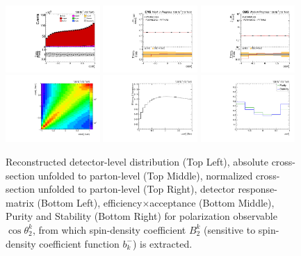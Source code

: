 \begin{figure}[htb]
\begin{center}
 \includegraphics[width=0.32\textwidth]{fig_fullRun2UL/controlplots/combined/Hyp_LeptonBk.pdf}
 \includegraphics[width=0.32\textwidth]{fig_fullRun2UL/unfolding/combined/UnfoldedResults_b2k.pdf}
 \includegraphics[width=0.32\textwidth]{fig_fullRun2UL/unfolding/combined/UnfoldedResultsNorm_b2k.pdf} \\
 \includegraphics[width=0.32\textwidth]{fig_fullRun2UL/unfolding/combined/ResponseMatrix_b2k.pdf}
 \includegraphics[width=0.32\textwidth]{fig_fullRun2UL/unfolding/combined/TotEff_b2k.pdf}
 \includegraphics[width=0.32\textwidth]{fig_fullRun2UL/unfolding/combined/PurStab_b2k.pdf} \\
\caption{Reconstructed detector-level distribution (Top Left), absolute cross-section unfolded to parton-level (Top Middle), normalized cross-section unfolded to parton-level (Top Right), detector response-matrix (Bottom Left), efficiency$\times$acceptance (Bottom Middle), Purity and Stability (Bottom Right) for polarization observable $\cos\theta_{2}^{k}$, from which spin-density coefficient $B_{2}^{k}$ (sensitive to spin-density coefficient function $b_k^{-}$) is extracted.}
\label{fig:b2k}
\end{center}
\end{figure}
